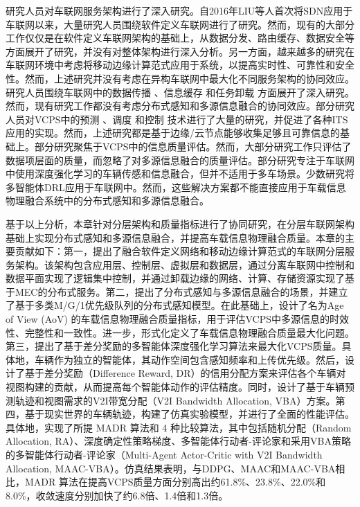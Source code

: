 研究人员对车联网服务架构进行了深入研究。自2016年LIU等人\cite{liu2016cooperative}首次将SDN应用于车联网以来，大量研究人员围绕软件定义车联网进行了研究\cite{dai2018cooperative, luo2018sdnmac, liu2018coding, zhang2022ac-sdvn, zhao2022elite, lin2023alps, ahmed2023deep}。然而，现有的大部分工作仅仅是在软件定义车联网架构的基础上，从数据分发、路由缓存、数据安全等方面展开了研究，并没有对整体架构进行深入分析。另一方面，越来越多的研究在车联网环境中考虑将移动边缘计算范式应用于系统，以提高实时性、可靠性和安全性\cite{liu2017a, lang2022cooperative, liu2021fog, dai2021edge, zhang2022digital, liu2020adaptive, liao2021learning, liu2023mobility, liu2023asynchronous}。然而，上述研究并没有考虑在异构车联网中最大化不同服务架构的协同效应。研究人员围绕车联网中的数据传播 \cite{liu2021fog, singh2020intent}、信息缓存 \cite{zhang2022digital, dai2020deep, su2018an} 和任务卸载 \cite{shang2021deep, liao2021learning} 方面展开了深入研究。然而，现有研究工作都没有考虑分布式感知和多源信息融合的协同效应。部分研究人员对VCPS中的预测 \cite{zhang2019a, zhang2020data}、调度 \cite{li2020cyber, lian2021cyber} 和控制 \cite{dai2016a, hu2017cyber, lv2018driving}技术进行了大量的研究，并促进了各种ITS应用的实现。然而，上述研究都是基于边缘/云节点能够收集足够且可靠信息的基础上。部分研究聚焦于VCPS中的信息质量评估\cite{liu2014temporal, dai2019temporal, liu2014scheduling, rager2017scalability, yoon2021performance}。然而，大部分研究工作只评估了数据项层面的质量，而忽略了对多源信息融合的质量评估。部分研究专注于车联网中使用深度强化学习的车辆传感和信息融合\cite{dong2020spatio, zhao2020social, mlika2022deep}，但并不适用于多车场景。少数研究将多智能体DRL应用于车联网中\cite{kumar2022multi, he2021efficient}。然而，这些解决方案都不能直接应用于车载信息物理融合系统中的分布式感知和多源信息融合。

基于以上分析，本章针对分层架构和质量指标进行了协同研究，在分层车联网架构基础上实现分布式感知和多源信息融合，并提高车载信息物理融合质量。本章的主要贡献如下：第一，提出了融合软件定义网络和移动边缘计算范式的车联网分层服务架构。该架构包含应用层、控制层、虚拟层和数据层，通过分离车联网中控制和数据平面实现了逻辑集中控制，并通过卸载边缘的网络、计算、存储资源实现了基于MEC的分布式服务。第二，提出了分布式感知与多源信息融合的场景，并建立了基于多类M/G/1优先级队列的分布式感知模型。在此基础上，设计了名为Age of View (AoV) 的车载信息物理融合质量指标，用于评估VCPS中多源信息的时效性、完整性和一致性。进一步，形式化定义了车载信息物理融合质量最大化问题。第三，提出了基于差分奖励的多智能体深度强化学习算法来最大化VCPS质量。具体地，车辆作为独立的智能体，其动作空间包含感知频率和上传优先级。然后，设计了基于差分奖励（Difference Reward, DR）的信用分配方案来评估各个车辆对视图构建的贡献，从而提高每个智能体动作的评估精度。同时，设计了基于车辆预测轨迹和视图需求的V2I带宽分配（V2I Bandwidth Allocation, VBA）方案。第四，基于现实世界的车辆轨迹，构建了仿真实验模型，并进行了全面的性能评估。具体地，实现了所提 MADR 算法和 4 种比较算法，其中包括随机分配（Random Allocation, RA）、深度确定性策略梯度\cite{mlika2022deep}、多智能体行动者-评论家\cite{he2021efficient}和采用VBA策略的多智能体行动者-评论家（Multi-Agent Actor-Critic with V2I Bandwidth Allocation, MAAC-VBA）。仿真结果表明，与DDPG、MAAC和MAAC-VBA相比，MADR 算法在提高VCPS质量方面分别高出约61.8\%、23.8\%、22.0\%和8.0\%，收敛速度分别加快了约6.8倍、1.4倍和1.3倍。

